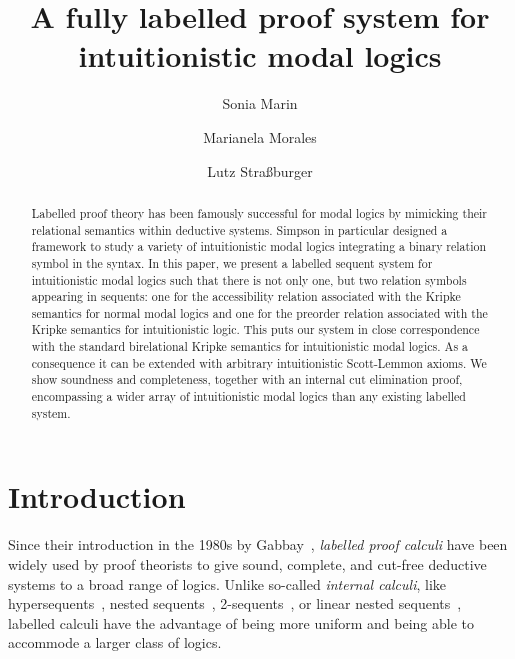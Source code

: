 \documentclass[a4paper]{article}
\title{A fully labelled proof system for intuitionistic modal logics}
\author[1]{Sonia Marin}
\author[2,3]{Marianela Morales}
\author[3,2]{Lutz Stra{\ss}burger}
\affil[1]{University College London}
\affil[2]{Laboratoire d'Informatique de l'\'Ecole Polytechnique}
\affil[3]{Inria Saclay}
\date{}
\theoremstyle{plain}
\theoremstyle{definition}
\begin{document}
  \maketitle
  
 \begin{abstract}
   Labelled proof theory has been famously successful for modal logics by mimicking their relational semantics within deductive systems. Simpson in particular designed a framework to study a variety of intuitionistic modal logics integrating a binary relation symbol in the syntax.
   In this paper, we present a labelled sequent system for
   intuitionistic modal logics such that there is not only one, but
   two relation symbols appearing in sequents: one for the accessibility
   relation associated with the Kripke semantics for normal modal logics and
   one for the preorder relation associated with the Kripke semantics
   for intuitionistic logic.
   This puts our system in close correspondence with the standard
   birelational Kripke semantics for intuitionistic modal logics. 
   As a consequence it can be extended with arbitrary intuitionistic Scott-Lemmon axioms. 
   We show soundness and completeness, together with an internal cut elimination proof, encompassing a wider array of intuitionistic modal logics than any existing labelled system.
 \end{abstract}
 
 \section{Introduction}\label{sec:intro}
 
 Since their introduction in the 1980s by Gabbay~\cite{gabbay:96},
 \emph{labelled proof calculi} have been widely used by proof theorists
 to give sound, complete, and cut-free deductive systems to a broad range
 of logics. Unlike so-called \emph{internal calculi}, like
 hypersequents~\cite{avron:elc96}, nested
 sequents~\cite{kashima:sl94,brunnler:aml09,poggiolesi:tmp09}, 
 2-sequents~\cite{masini:apal92}, or linear nested sequents~\cite{lellmann:tableaux15},
 labelled calculi have the advantage of being more uniform and being able to 
 accommode a larger class of logics.
 
\end{document}
